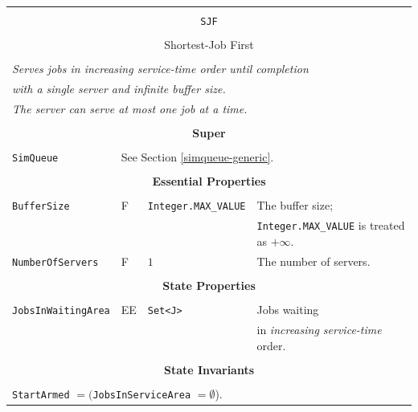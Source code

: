 \documentclass[12pt]{book}
\begin{document}
\begin{tabular}{|l|l|l|l|}
\hline
\multicolumn{4}{|c|}{} \\
\multicolumn{4}{|c|}{\lstinline[basicstyle=\large]{SJF}} \\
\multicolumn{4}{|c|}{} \\
\multicolumn{4}{|c|}{Shortest-Job First} \\
\multicolumn{4}{|c|}{} \\
\hline
\multicolumn{4}{|l|}{\em Serves jobs in increasing service-time order until completion} \\
\multicolumn{4}{|l|}{\em with a single server and infinite buffer size.} \\
\multicolumn{4}{|l|}{\em The server can serve at most one job at a time.} \\
\hline
\multicolumn{4}{|c|}{} \\
\multicolumn{4}{|c|}{\bf Super} \\
\multicolumn{4}{|c|}{} \\
\hline
\lstinline|SimQueue| & \multicolumn{3}{|l|}{See Section \ref{simqueue-generic}.} \\
\hline
\multicolumn{4}{|c|}{} \\
\multicolumn{4}{|c|}{\bf Essential Properties} \\
\multicolumn{4}{|c|}{} \\
\hline
\lstinline|BufferSize|      & F & \lstinline|Integer.MAX_VALUE|
                            & The buffer size; \\
                        & & & \lstinline|Integer.MAX_VALUE| is treated as $+\infty$. \\
\hline
\lstinline|NumberOfServers| & F & $1$
                            & The number of servers. \\
\hline
\multicolumn{4}{|c|}{} \\
\multicolumn{4}{|c|}{\bf State  Properties} \\
\multicolumn{4}{|c|}{} \\
\hline
\lstinline|JobsInWaitingArea| & EE & \lstinline|Set<J>| & Jobs waiting \\
                              &    &                    & in {\em increasing service-time\/} order. \\
\hline
\multicolumn{4}{|c|}{} \\
\multicolumn{4}{|c|}{\bf State  Invariants} \\
\multicolumn{4}{|c|}{} \\
\hline
\multicolumn{4}{|l|}{\lstinline|StartArmed| $= ($\lstinline|JobsInServiceArea| $= \emptyset$).} \\

\end{tabular}
\end{document}

